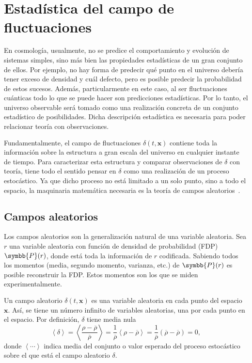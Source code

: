 \section{Estadística del campo de fluctuaciones}
En cosmología, usualmente, no se predice el comportamiento y evolución de sistemas simples, sino más bien las propiedades estadísticas de un gran conjunto de ellos. Por ejemplo, no hay forma de predecir qué punto en el universo debería tener exceso de densidad y cuál defecto, pero es posible predecir la probabilidad de estos sucesos. Además, particularmente en este caso, al ser fluctuaciones cuánticas todo lo que se puede hacer son predicciones estadísticas. Por lo tanto, el universo observable será tomado como una realización concreta de un conjunto estadístico de posibilidades. Dicha descripción estadística es necesaria para poder relacionar teoría con observaciones.

Fundamentalmente, el campo de fluctuaciones \(\delta(t,\symbf{x})\) contiene toda la información sobre la estructura a gran escala del universo en cualquier instante de tiempo. Para caracterizar esta estructura y comparar observaciones de \(\delta\) con teoría, tiene todo el sentido pensar en \(\delta\) como una realización de un proceso estocástico. Ya que dicho proceso no está limitado a un solo punto, sino a todo el espacio, la maquinaria matemática necesaria es la teoría de campos aleatorios~\cite{MILLER1975185}.
\subsection{Campos aleatorios}
Los campos aleatorios son la generalización natural de una variable aleatoria. Sea \(r\) una variable aleatoria con función de densidad de probabilidad (FDP) \(\symbb{P}(r)\), donde está toda la información de \(r\) codificada. Sabiendo todos los momentos (media, segundo momento, varianza, etc.) de \(\symbb{P}(r)\) es posible reconstruir la FDP. Estos momentos son los que se miden experimentalmente.

Un campo aleatorio \(\delta(t,\symbf{x})\) es una variable aleatoria en cada punto del espacio \(\symbf{x}\). Así, se tiene un número infinito de variables aleatorias, una por cada punto en el espacio. Por definición, \(\delta\) tiene media nula
\begin{equation}
    \left\langle\delta\right\rangle=\left\langle\frac{\rho-\overbar{\rho}}{\overbar{\rho}}\right\rangle=\frac{1}{\overbar{\rho}}\left\langle\rho-\overbar{\rho}\right\rangle=\frac{1}{\overbar{\rho}}\left(\overbar{\rho}-\overbar{\rho}\right)=0,\label{eq::media}
\end{equation}
donde \(\left\langle\cdots\right\rangle\) indica media del conjunto o valor esperado del proceso estocástico sobre el que está el campo aleatorio \(\delta\).

